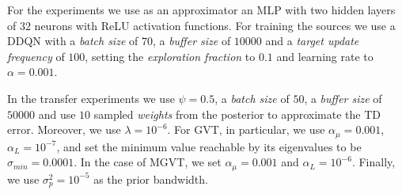 \documentclass{article}
\begin{document}
For the experiments we use as an approximator an MLP with two hidden layers of $32$ neurons with ReLU activation functions. For training the sources we use a DDQN with a \textit{batch size} of $70$, a \textit{buffer size} of $10000$ and a \textit{target update frequency} of $100$, setting the \textit{exploration fraction} to $0.1$ and learning rate to $\alpha=0.001$.

In the transfer experiments we use $\psi=0.5$, a \textit{batch size} of $50$, a \textit{buffer size} of $50000$ and use $10$ sampled \textit{weights} from the posterior to approximate the TD error. Moreover, we use $\lambda=10^{-6}$. For GVT, in particular, we use $\alpha_{\mu}=0.001$, $\alpha_{L}=10^{-7}$, and set the minimum value reachable by its eigenvalues to be $\sigma_{min}=0.0001$. In the case of MGVT, we set $\alpha_{\mu}=0.001$ and $\alpha_{L}=10^{-6}$. Finally, we use $\sigma_p^2=10^{-5}$ as the prior bandwidth.
\end{document}
